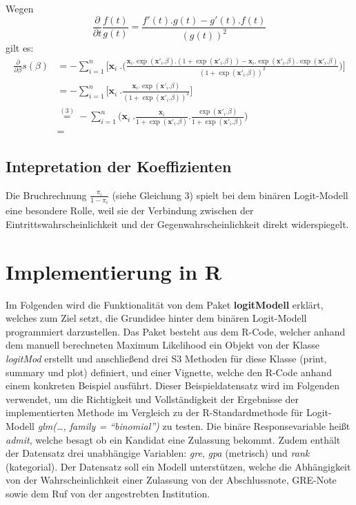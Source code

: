 \documentclass[12pt,]{article}
\begin{document}
Wegen \[
\frac{\partial}{\partial t} \frac{f(t)}{g(t)} = \frac{f'(t).g(t) - g'(t).f(t)}{(g(t))^2}
\] gilt es: \[
\begin{aligned}
\frac{\partial}{\partial \beta} s(\beta) &= - \sum_{i = 1}^{n} \Bigg[ \mathbf{x}_i \ . \Bigg( \frac{\mathbf{x}_i.\exp(\mathbf{x'}_i.\beta).(1+\exp(\mathbf{x'}_i.\beta))-\mathbf{x}_i.\exp(\mathbf{x'}_i.\beta).\exp(\mathbf{x'}_i.\beta)}{(1+\exp(\mathbf{x'}_i.\beta))^2} \Bigg) \Bigg] \\
&= - \sum_{i = 1}^{n} \Bigg[ \mathbf{x}_i \ . \frac{\mathbf{x}_i.\exp(\mathbf{x'}_i.\beta)}{(1+\exp(\mathbf{x'}_i.\beta))^2}  \Bigg] \\
&\mathrel{\overset{(3)}{=}} - \sum_{i = 1}^{n} \Bigg( \mathbf{x}_i \ . \frac{\mathbf{x}_i}{1+\exp(\mathbf{x'}_i.\beta)} . \frac{\exp(\mathbf{x'}_i.\beta)}{1+\exp(\mathbf{x'}_i.\beta)} \Bigg) \\
&= 
\end{aligned}
\]

\subsection{Intepretation der
Koeffizienten}\label{intepretation-der-koeffizienten}

Die Bruchrechnung \(\frac{\pi_i}{1-\pi_i}\) (siehe Gleichung 3) spielt
bei dem binären Logit-Modell eine besondere Rolle, weil sie der
Verbindung zwischen der Eintrittswahrscheinlichkeit und der
Gegenwahrscheinlichkeit direkt widerspiegelt.

\section{Implementierung in R}\label{implementierung-in-r}

Im Folgenden wird die Funktionalität von dem Paket \textbf{logitModell}
erklärt, welches zum Ziel setzt, die Grundidee hinter dem binären
Logit-Modell programmiert darzustellen. Das Paket besteht aus dem
R-Code, welcher anhand dem manuell berechneten Maximum Likelihood ein
Objekt von der Klasse \emph{logitMod} erstellt und anschließend drei S3
Methoden für diese Klasse (print, summary und plot) definiert, und einer
Vignette, welche den R-Code anhand einem konkreten Beispiel ausführt.
Dieser Beispieldatensatz wird im Folgenden verwendet, um die Richtigkeit
und Vollständigkeit der Ergebnisse der implementierten Methode im
Vergleich zu der R-Standardmethode für Logit-Modell \emph{glm(\ldots{},
family = ``binomial'')} zu testen. Die binäre Responsevariable heißt
\emph{admit}, welche besagt ob ein Kandidat eine Zulassung bekommt.
Zudem enthält der Datensatz drei unabhängige Variablen: \emph{gre},
\emph{gpa} (metrisch) und \emph{rank} (kategorial). Der Datensatz soll
ein Modell unterstützen, welche die Abhängigkeit von der
Wahrscheinlichkeit einer Zulassung von der Abschlussnote, GRE-Note sowie
dem Ruf von der angestrebten Institution.
\end{document}
